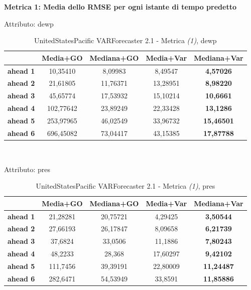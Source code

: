 \documentclass[12pt,a4paper,oneside,openright]{book}
\begin{document}
\newpage

\textbf{Metrica 1: Media dello RMSE per ogni istante di tempo predetto} \medskip

Attributo: dewp \\ 
\begin{table}[H]
\centering
\begin{tabular}{|c|c|c|c|c|}
\hline
 & \textbf{Media+GO} & \textbf{Mediana+GO} & \textbf{Media+Var} & \textbf{Mediana+Var} \\
\hline
\textbf{ahead 1} & 10,35410 & 8,09983 & 8,49547 & \textbf{4,57026} \\
\hline
\textbf{ahead 2} & 21,61805 & 11,76371 & 13,28951 & \textbf{8,98220} \\
\hline
\textbf{ahead 3} & 45,65774 & 17,53932 & 15,10214 & \textbf{10,6661} \\
\hline
\textbf{ahead 4} & 102,77642 & 23,89249 & 22,33428 & \textbf{13,1286} \\
\hline
\textbf{ahead 5} & 253,97965 & 46,02549 & 33,96732 & \textbf{15,46501} \\
\hline
\textbf{ahead 6} & 696,45082 & 73,04417 & 43,15385 & \textbf{17,87788} \\
\hline
\end{tabular} \\
\caption{UnitedStatesPacific VARForecaster 2.1 - Metrica \textit{(1)}, dewp}
\end{table} 

\medskip

Attributo: pres \\ 

\begin{table}[H]
\centering
\begin{tabular}{|c|c|c|c|c|}
\hline
 & \textbf{Media+GO} & \textbf{Mediana+GO} & \textbf{Media+Var} & \textbf{Mediana+Var} \\
\hline
\textbf{ahead 1} & 21,28281 & 20,75721 & 4,29425 & \textbf{3,50544} \\
\hline
\textbf{ahead 2} & 27,66193 & 26,17847 & 8,09658 & \textbf{6,21739} \\
\hline
\textbf{ahead 3} & 37,6824 & 33,0506 & 11,1886 & \textbf{7,80243} \\
\hline
\textbf{ahead 4} & 48,2233 & 28,368 & 17,60297 & \textbf{9,42102} \\
\hline
\textbf{ahead 5} & 111,7456 & 39,39191 & 22,80009 & \textbf{11,24487} \\
\hline
\textbf{ahead 6} & 282,6471 & 54,53949 & 33,8591 & \textbf{11,85886} \\
\hline
\end{tabular} \\
\caption{UnitedStatesPacific VARForecaster 2.1 - Metrica \textit{(1)}, pres}
\end{table}
\end{document}
